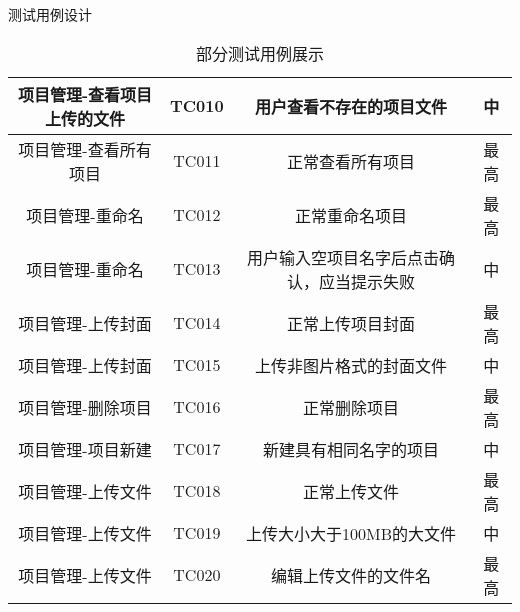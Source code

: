\begin{frame}{测试用例设计}
\begin{table}[]
{\begin{tabular}{c|c|c|c}
                \hline
                项目管理-查看项目上传的文件 & TC010               & 用户查看不存在的项目文件                                         & 中              \\
                \hline
                项目管理-查看所有项目       & TC011               & 正常查看所有项目                                                 & 最高            \\
                \hline
                项目管理-重命名             & TC012               & 正常重命名项目                                                   & 最高            \\
                \hline
                项目管理-重命名             & TC013               & 用户输入空项目名字后点击确认，应当提示失败                       & 中              \\
                \hline
                项目管理-上传封面           & TC014               & 正常上传项目封面                                                 & 最高            \\
                \hline
                项目管理-上传封面           & TC015               & 上传非图片格式的封面文件                                         & 中              \\
                \hline
                项目管理-删除项目           & TC016               & 正常删除项目                                                     & 最高            \\
                \hline
                项目管理-项目新建           & TC017               & 新建具有相同名字的项目                                           & 中              \\
                \hline
                项目管理-上传文件           & TC018               & 正常上传文件                                                     & 最高            \\
                \hline
                项目管理-上传文件           & TC019               & 上传大小大于100MB的大文件                                        & 中              \\
                \hline
                项目管理-上传文件           & TC020               & 编辑上传文件的文件名                                             & 最高            \\
            \end{tabular}
        }
        \caption{部分测试用例展示}
        \label{tab:tech-strategy}
    \end{table}
\end{frame}


